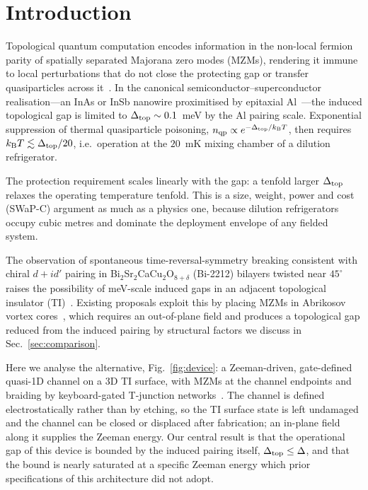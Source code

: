 \documentclass[aps,prb,twocolumn,superscriptaddress,floatfix,nofootinbib]{revtex4-2}
\newcommand{\dtop}{\Delta_{\rm top}}
\newcommand{\kB}{k_{\rm B}}
\begin{document}
\section{Introduction}

Topological quantum computation encodes information in the non-local fermion
parity of spatially separated Majorana zero modes (MZMs), rendering it immune
to local perturbations that do not close the protecting gap or transfer
quasiparticles across it~\cite{Kitaev2001,Nayak2008}. In the canonical
semiconductor--superconductor realisation---an InAs or InSb nanowire
proximitised by epitaxial Al~\cite{Lutchyn2010,Oreg2010}---the induced
topological gap is limited to $\dtop \sim 0.1$~meV by the Al pairing scale.
Exponential suppression of thermal quasiparticle poisoning,
$n_{\rm qp} \propto e^{-\dtop/\kB T}$, then requires
$\kB T \lesssim \dtop/20$, i.e.\ operation at the $20$~mK mixing chamber of a
dilution refrigerator.

The protection requirement scales linearly with the gap: a tenfold larger
$\dtop$ relaxes the operating temperature tenfold. This is a size, weight,
power and cost (SWaP-C) argument as much as a physics one, because dilution
refrigerators occupy cubic metres and dominate the deployment envelope of any
fielded system.

The observation of spontaneous time-reversal-symmetry breaking consistent with
chiral $d+id'$ pairing in Bi$_2$Sr$_2$CaCu$_2$O$_{8+\delta}$ (Bi-2212)
bilayers twisted near $45^\circ$~\cite{Can2021,Zhao2023} raises the
possibility of meV-scale induced gaps in an adjacent topological insulator
(TI)~\cite{FuKane2008}. Existing proposals exploit this by placing MZMs in
Abrikosov vortex cores~\cite{Margalit2022,Zhu2023}, which requires an
out-of-plane field and produces a topological gap reduced from the induced
pairing by structural factors we discuss in Sec.~\ref{sec:comparison}.

Here we analyse the alternative, Fig.~\ref{fig:device}: a Zeeman-driven,
gate-defined quasi-1D channel on a 3D TI surface, with MZMs at the channel
endpoints and braiding by keyboard-gated T-junction
networks~\cite{Karzig2017}. The channel is defined electrostatically rather
than by etching, so the TI surface state is left undamaged and the channel can
be closed or displaced after fabrication; an in-plane field along it supplies
the Zeeman energy. Our central result is that the operational gap of this
device is bounded by the induced pairing itself, $\dtop \le \Delta$, and that
the bound is nearly saturated at a specific Zeeman energy which prior
specifications of this architecture did not adopt.
\end{document}
